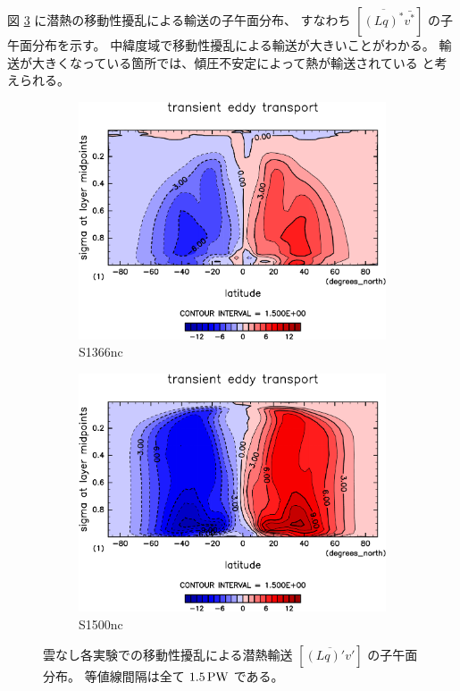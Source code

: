 \documentclass[body]{subfiles}
\begin{document}
図 \ref{潜熱移動性擾乱nc} に潜熱の移動性擾乱による輸送の子午面分布、
すなわち \([\overline{(Lq)^*}\bar{v^*}]\) の子午面分布を示す。
中緯度域で移動性擾乱による輸送が大きいことがわかる。
輸送が大きくなっている箇所では、傾圧不安定によって熱が輸送されている
と考えられる。

\afterpage{\clearpage}

\begin{figure}[t]
	\centering
	\begin{subfigure}{.4\textwidth}
		\centering
		\includegraphics[width=\textwidth]{S1366-nc/MeriHeatTransTest@latentEn_TE,time=3650:4015-crop-rotate.pdf}
		\caption{S1366nc}\label{潜熱移動性擾乱S1366nc}
	\end{subfigure}
	\begin{subfigure}{.4\textwidth}
		\centering
		\includegraphics[width=\textwidth]{S1500-nc/MeriHeatTransTest@latentEn_TE,time=3650:4015-crop-rotate.pdf}
		\caption{S1500nc}\label{潜熱移動性擾乱S1500nc}
	\end{subfigure}
	\caption[雲なし各実験での移動性擾乱による潜熱輸送の子午面分布]{
		雲なし各実験での移動性擾乱による潜熱輸送 \([\overline{(Lq)'v'}]\) の子午面分布。
		等値線間隔は全て \(1.5\hmu{PW}\) である。
	}\label{潜熱移動性擾乱nc}
\end{figure}
\end{document}
